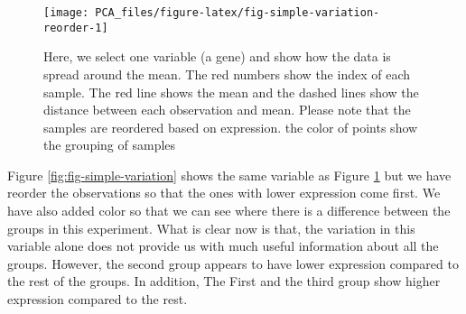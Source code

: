 \documentclass[
]{book}
\newenvironment{Shaded}{\begin{snugshade}}{\end{snugshade}}
\newcommand{\CommentTok}[1]{\textcolor[rgb]{0.56,0.35,0.01}{\textit{#1}}}
\newcommand{\ControlFlowTok}[1]{\textcolor[rgb]{0.13,0.29,0.53}{\textbf{#1}}}
\newcommand{\DataTypeTok}[1]{\textcolor[rgb]{0.13,0.29,0.53}{#1}}
\newcommand{\DecValTok}[1]{\textcolor[rgb]{0.00,0.00,0.81}{#1}}
\newcommand{\FloatTok}[1]{\textcolor[rgb]{0.00,0.00,0.81}{#1}}
\newcommand{\KeywordTok}[1]{\textcolor[rgb]{0.13,0.29,0.53}{\textbf{#1}}}
\newcommand{\NormalTok}[1]{#1}
\newcommand{\OperatorTok}[1]{\textcolor[rgb]{0.81,0.36,0.00}{\textbf{#1}}}
\newcommand{\StringTok}[1]{\textcolor[rgb]{0.31,0.60,0.02}{#1}}
\theoremstyle{definition}
\theoremstyle{definition}
\theoremstyle{definition}
\theoremstyle{remark}
\begin{document}
\begin{Shaded}
\end{Shaded}

\begin{figure}

{\centering \texttt{[image: PCA\_files/figure-latex/fig-simple-variation-reorder-1]} 

}

\caption{Here, we select one variable (a gene) and show how the data is spread around the mean. The red numbers show the index of each sample. The red line shows the mean and the dashed lines show the distance between each observation and mean. Please note that the samples are reordered based on expression. the color of points show the grouping of samples}\label{fig:fig-simple-variation-reorder}
\end{figure}

Figure \ref{fig:fig-simple-variation} shows the same variable as Figure \ref{fig:fig-simple-variation-reorder} but we have reorder the observations so that the ones with lower expression come first. We have also added color so that we can see where there is a difference between the groups in this experiment. What is clear now is that, the variation in this variable alone does not provide us with much useful information about all the groups. However, the second group appears to have lower expression compared to the rest of the groups. In addition, The First and the third group show higher expression compared to the rest.
\end{document}
